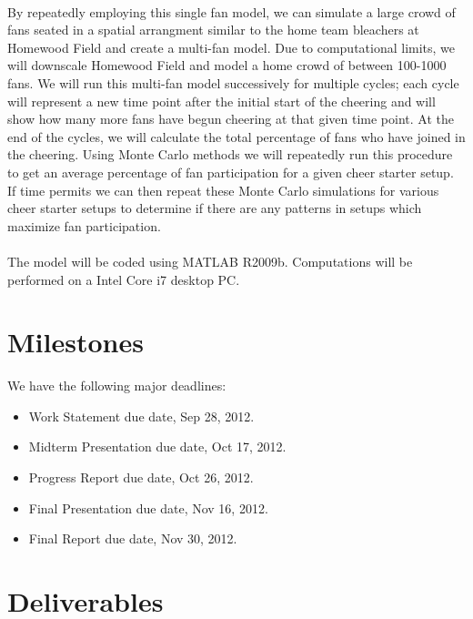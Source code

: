 \documentclass[12pt,letterpaper]{article}
\theoremstyle{definition}
\begin{document}
\paragraph{}
By repeatedly employing this single fan model, we can simulate a large crowd of fans seated in a spatial arrangment similar to the home team bleachers at Homewood Field and create a multi-fan model. Due to computational limits, we will downscale Homewood Field and model a home crowd of between 100-1000 fans. We will run this multi-fan model successively for multiple cycles; each cycle will represent a new time point after the initial start of the cheering and will show how many more fans have begun cheering at that given time point. At the end of the cycles, we will calculate the total percentage of fans who have joined in the cheering. Using Monte Carlo methods we will repeatedly run this procedure to get an average percentage of fan participation for a given cheer starter setup. If time permits we can then repeat these Monte Carlo simulations for various cheer starter setups to determine if there are any patterns in setups which maximize fan participation. 
\paragraph{}
The model will be coded using MATLAB R2009b. Computations will be performed on a Intel Core i7 desktop PC. 

\section{Milestones}
We have the following major deadlines:
\begin{itemize}
    \item Work Statement due date, Sep 28, 2012.
    \item Midterm Presentation due date, Oct 17, 2012.
    \item Progress Report due date, Oct 26, 2012.
    \item Final Presentation due date, Nov 16, 2012.
    \item Final Report due date, Nov 30, 2012.
\end{itemize}

\section{Deliverables}
\end{document}
